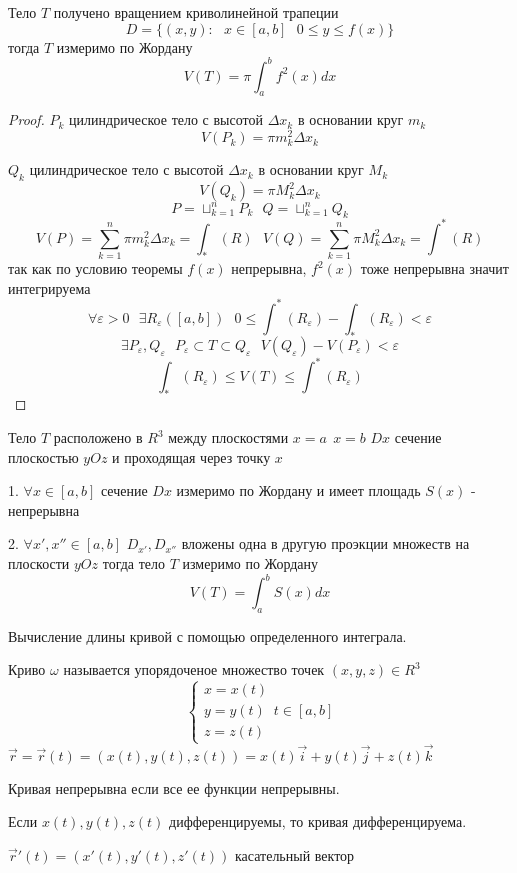 \begin{theorem}
  Тело $T$ получено вращением криволинейной трапеции
  $$
  D = \{ (x,y): ~~~ x \in [a,b] ~~~
  0 \le y \le f(x) \}
  $$
  тогда $T$ измеримо по Жордану
  $$
  V(T) = \pi \int_a^b f^2(x) dx
  $$
\end{theorem}

\begin{proof}
  $P_k$ цилиндрическое тело с высотой $\Delta x_k$ в основании круг $m_k$
  $$V(P_k) = \pi m_k^2 \Delta x_k$$

  $Q_k$ цилиндрическое тело с высотой $\Delta x_k$ в основании круг $M_k$
  $$V(Q_k) = \pi M_k^2 \Delta x_k$$
  $$
  P = \sqcup_{k=1}^n P_k ~~~
  Q = \sqcup_{k=1}^n Q_k
  $$
  $$
  V(P) = \sum_{k=1}^n \pi m_k^2 \Delta x_k = \int_* (R) ~~~
  V(Q) = \sum_{k=1}^n \pi M_k^2 \Delta x_k = \int^* (R)
  $$
  так как по условию теоремы $f(x)$ непрерывна, $f^2(x)$ тоже непрерывна значит
  интегрируема
  $$
  \forall \varepsilon > 0 ~~~
  \exists R_{\varepsilon} ([a,b]) ~~~
  0 \le \int^* (R_{\varepsilon}) - \int_* (R_{\varepsilon}) < \varepsilon
  $$
  $$
  \exists P_{\varepsilon}, Q_{\varepsilon} ~~~
  P_{\varepsilon} \subset T \subset Q_{\varepsilon} ~~~
  V(Q_{\varepsilon}) - V(P_{\varepsilon}) < \varepsilon
  $$
  $$
  \int_* (R_{\varepsilon}) \le V(T) \le \int^* (R_{\varepsilon})
  $$
\end{proof}

\begin{theorem}
  Тело $T$ расположено в $R^3$ между плоскостями $x = a ~~ x = b$
  $Dx$ сечение плоскостью $yOz$ и проходящая через точку $x$

  1. $\forall x \in [a,b]$ сечение $Dx$ измеримо по Жордану и имеет площадь
  $S(x)$ - непрерывна

  2. $\forall x', x'' \in [a,b]$ $D_{x'}, D_{x''}$ вложены одна в другую
  проэкции множеств на плоскости $yOz$ тогда тело $T$ измеримо по Жордану
  $$
  V(T) = \int_a^b S(x)dx
  $$
\end{theorem}

\begin{title}[\Large]
  Вычисление длины кривой с помощью определенного интеграла.
\end{title}

\begin{defin}[кривой]
  Криво $\omega$ называется упорядоченое множество точек $(x,y,z) \in R^3$
  $$
    \left\{
      \begin{array}{l}
        x = x(t) \\
        y = y(t) \\
        z = z(t)
      \end{array}
    \right.
    t \in [a,b]
  $$
  $
  \vec r = \vec r (t) = ( x(t), y(t) , z(t) ) =
  x(t)\vec i + y(t)\vec j + z(t)\vec k
  $

  Кривая непрерывна если все ее функции непрерывны.

  Если $x(t), y(t), z(t)$ дифференцируемы, то кривая дифференцируема.

  $\vec r'(t) = ( x'(t), y'(t) , z'(t) )$ касательный вектор
\end{defin}

